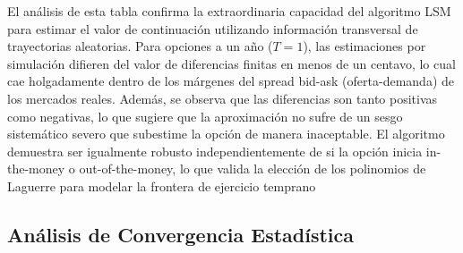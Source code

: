\begin{table}[H]
  \centering
  \small
  \caption{Comparación de Valoración para Put Americana (Diferencias Finitas vs. LSM). Parámetros: $K=40$, $r=0.06$, $\sigma=0.20$. Simulación LSM con 100,000 trayectorias, 50 pasos temporales por año, 3 polinomios de Laguerre.}
  \label{tab:lsm_americanas}
\end{table}

El análisis de esta tabla confirma la extraordinaria capacidad del algoritmo LSM para estimar el valor de continuación utilizando información transversal de trayectorias aleatorias. Para opciones a un año ($T=1$), las estimaciones por simulación difieren del valor de diferencias finitas en menos de un centavo, lo cual cae holgadamente dentro de los márgenes del spread bid-ask (oferta-demanda) de los mercados reales. Además, se observa que las diferencias son tanto positivas como negativas, lo que sugiere que la aproximación no sufre de un sesgo sistemático severo que subestime la opción de manera inaceptable. El algoritmo demuestra ser igualmente robusto independientemente de si la opción inicia in-the-money o out-of-the-money, lo que valida la elección de los polinomios de Laguerre para modelar la frontera de ejercicio temprano

\subsection{Análisis de Convergencia Estadística}

